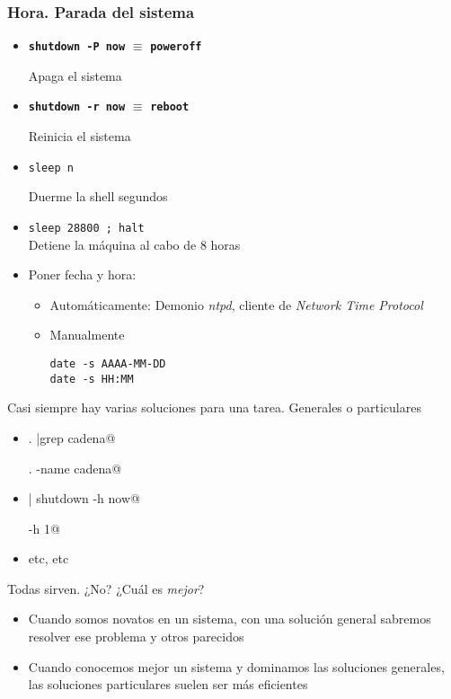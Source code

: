 \documentclass[ucs]{beamer}
\begin{document}
\begin{frame}[fragile]

\frametitle{Hora. Parada del sistema}
  \begin{itemize}
        \item \texttt{\textbf{shutdown -P now}} $\equiv$
          \texttt{\textbf{poweroff}}

Apaga el sistema
        \item \texttt{\textbf{shutdown -r now}} $\equiv$
          \texttt{\textbf{reboot}} 

Reinicia el sistema
\item 
\verb|sleep n|

Duerme la shell segundos  
\item 
\verb!sleep 28800 ; halt ! \\Detiene la máquina al cabo de 8 horas
  \end{itemize}
\end{frame}



\begin{frame}[fragile]
\begin{itemize}
  
\item 
Poner fecha y hora:
\begin{itemize}
\item
Automáticamente: Demonio \emph{ntpd}, cliente de \emph{Network Time Protocol}

\item
Manualmente

\verb|date -s AAAA-MM-DD| \\
\verb|date -s HH:MM| 
\end{itemize}

\end{itemize}
\end{frame}



\begin{frame}[fragile]
Casi siempre hay varias soluciones para una tarea. Generales o particulares
\begin{itemize}	
\item 
\verb@find . |grep cadena@

\verb@find . -name cadena\*@
\item 
{} | shutdown -h now@

\verb@shutdown -h 1@

\item 
etc, etc
\end{itemize}
Todas sirven. ¿No? ¿Cuál es \emph{mejor}?
\begin{itemize}	
\item 
Cuando somos novatos en un sistema, con una solución general
sabremos resolver ese problema y otros parecidos
\item 
Cuando conocemos mejor un sistema y dominamos las soluciones
generales, las soluciones particulares
suelen ser más eficientes
\end{itemize}

\end{frame}
\end{document}
